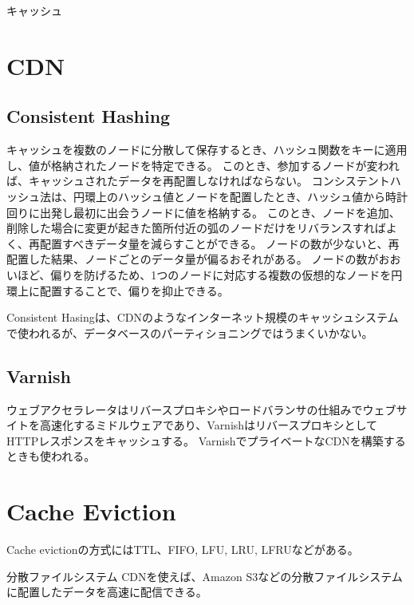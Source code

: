 \documentclass[book]{jlreq}
\begin{document}
\begin{chapter-bib}{キャッシュ}
  \section{CDN}
  \subsection{Consistent Hashing}
  キャッシュを複数のノードに分散して保存するとき、ハッシュ関数をキーに適用し、値が格納されたノードを特定できる。
  このとき、参加するノードが変われば、キャッシュされたデータを再配置しなければならない。
  コンシステントハッシュ法は、円環上のハッシュ値とノードを配置したとき、ハッシュ値から時計回りに出発し最初に出会うノードに値を格納する\cite{sdi}。
  このとき、ノードを追加、削除した場合に変更が起きた箇所付近の弧のノードだけをリバランスすればよく、再配置すべきデータ量を減らすことができる。
  ノードの数が少ないと、再配置した結果、ノードごとのデータ量が偏るおそれがある。
  ノードの数がおおいほど、偏りを防げるため、1つのノードに対応する複数の仮想的なノードを円環上に配置することで、偏りを抑止できる。
  
  Consistent Hasingは、CDNのようなインターネット規模のキャッシュシステムで使われるが、データベースのパーティショニングではうまくいかない\cite{DBLP:journals/corr/LampingV14}。
  \subsection{Varnish}
  ウェブアクセラレータはリバースプロキシやロードバランサの仕組みでウェブサイトを高速化するミドルウェアであり、VarnishはリバースプロキシとしてHTTPレスポンスをキャッシュする\cite{varnish,webaccel}。
  VarnishでプライベートなCDNを構築するときも使われる\cite{varnish-private-cdn}。
  \section{Cache Eviction}
  Cache evictionの方式にはTTL、FIFO, LFU, LRU, LFRUなどがある\cite{lc-cache}。
\end{chapter-bib}
\begin{chapter-bib}{分散ファイルシステム}
  CDNを使えば、Amazon S3などの分散ファイルシステムに配置したデータを高速に配信できる\cite{lc-databases}。
\end{chapter-bib}
\end{document}
